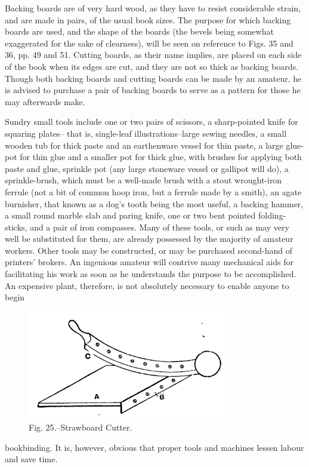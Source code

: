 \documentclass[twoside]{book}
\begin{document}
Backing boards are of very hard wood, as they
have to resist considerable strain, and are made in
pairs, of the usual book sizes. The purpose for which
backing boards are used, and the shape of the boards
(the bevels being somewhat exaggerated for the sake
of clearness), will be seen on reference to Figs. 35
and 36, pp. 49 and 51. Cutting boards, as their
name implies, are placed on each side of the book
when its edges are cut, and they are not so thick
as backing boards. Though both backing boards
and cutting boards can be made by an amateur, he
is advised to purchase a pair of backing boards to
serve as a pattern for those he may afterwards make.

Sundry small tools include one or two pairs of
scissors, a sharp-pointed knife for squaring plates--
that is, single-leaf illustrations--large sewing
needles, a small wooden tub for thick paste and an
earthenware vessel for thin paste, a large glue-pot
for thin glue and a smaller pot for thick glue, with
brushes for applying both paste and glue, sprinkle
pot (any large stoneware vessel or gallipot will do),
a sprinkle-brush, which must be a well-made brush
with a stout wrought-iron ferrule (not a bit of
common hoop iron, but a ferrule made by a smith), an
agate burnisher, that known as a dog's tooth being
\pagebreak
the most useful, a backing hammer, a small round
marble slab and paring knife, one or two bent
pointed folding-sticks, and a pair of iron compasses.
Many of these tools, or such as may very well be
substituted for them, are already possessed by the
majority of amateur workers. Other tools may be
constructed, or may be purchased second-hand of
printers' brokers. An ingenious amateur will contrive
many mechanical aids for facilitating his work
as soon as he understands the purpose to be
accomplished. An expensive plant, therefore, is not
absolutely necessary to enable anyone to begin
	\begin{figure}[h]
		\centering
		\includegraphics[width=0.8\textwidth]{Figures/_025.png}
		\caption*{Fig. 25.--Strawboard Cutter.}
	\end{figure}
bookbinding. It is, however, obvious that proper
tools and machines lessen labour and save time.
\end{document}
